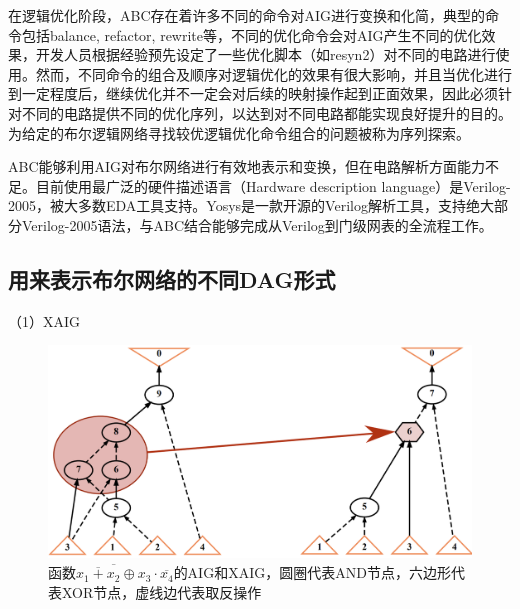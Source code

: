 


在逻辑优化阶段，ABC存在着许多不同的命令对AIG进行变换和化简，典型的命令包括balance, refactor, rewrite等，不同的优化命令会对AIG产生不同的优化效果，开发人员根据经验预先设定了一些优化脚本（如resyn2）对不同的电路进行使用。然而，不同命令的组合及顺序对逻辑优化的效果有很大影响，并且当优化进行到一定程度后，继续优化并不一定会对后续的映射操作起到正面效果\cite{LS:PIMap}，因此必须针对不同的电路提供不同的优化序列，以达到对不同电路都能实现良好提升的目的。为给定的布尔逻辑网络寻找较优逻辑优化命令组合的问题被称为序列探索。

ABC能够利用AIG对布尔网络进行有效地表示和变换，但在电路解析方面能力不足。目前使用最广泛的硬件描述语言（Hardware description language）是Verilog-2005，被大多数EDA工具支持。Yosys\cite{LS:yosys}是一款开源的Verilog解析工具，支持绝大部分Verilog-2005语法，与ABC结合能够完成从Verilog到门级网表的全流程工作。

\subsection{用来表示布尔网络的不同DAG形式}

（1）XAIG

\begin{figure}[!htbp]
    \centering
    \includegraphics[width=0.75\linewidth]{./figs/LS-XAIG.png}
    \caption{函数$ \overline{ \overline{x_1 + x_2} \oplus x_3} \cdot \overline{x_4} $的AIG和XAIG，圆圈代表AND节点，六边形代表XOR节点，虚线边代表取反操作}
    \label{LS:XAIG}
\end{figure}

